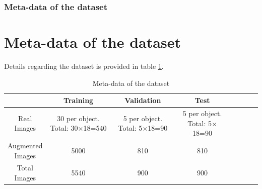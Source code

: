 \documentclass{beamer}
\begin{document}
\begin{frame}
	\frametitle{Meta-data of the dataset}
	\section{Meta-data of the dataset}
		Details regarding the dataset is provided in table \ref{Table:1}.

		\begin{table}[!htb]
		\centering
			\begin{tabular}{|c|c|c|c|c|c|c|c|}
			\hline 
    				& Training & Validation & Test \\ 
			\hline 
				\makecell{Real \\Images} & \makecell{30 per object.\\ Total: 30$\times$18=540} & \makecell{5 per object.\\ Total: 5$\times$18=90} & \makecell{5 per object.\\ Total: 5$\times$18=90} \\ 
			\hline 
				\makecell{Augmented\\ Images} & 5000 & 810 & 810 \\ 
			\hline 
				\makecell{Total\\ Images} & 5540 & 900 & 900 \\ 
			\hline 
			\end{tabular}
		\caption{Meta-data of the dataset} 
		\label{Table:1}
		\end{table}

\end{frame}
\end{document}
